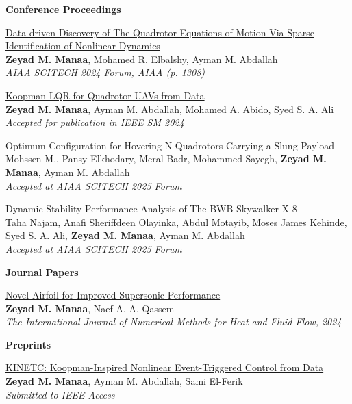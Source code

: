 \textbf{Conference Proceedings}
\begin{bibenum}
    \item \href{https://arxiv.org/pdf/2305.16500}{{Data-driven Discovery of The Quadrotor Equations of Motion Via Sparse Identification of Nonlinear Dynamics}}\\
    \textbf{Zeyad M. Manaa}, Mohamed R. Elbalshy, Ayman M. Abdallah\\
    \textit{AIAA SCITECH 2024 Forum, AIAA (p. 1308)}

    \item \href{https://arxiv.org/pdf/2406.17973}{Koopman-LQR for Quadrotor UAVs from Data}\\
    \textbf{Zeyad M. Manaa}, Ayman M. Abdallah, Mohamed A. Abido, Syed S. A. Ali\\
    \textit{Accepted for publication in IEEE SM 2024}

    \item {Optimum Configuration for Hovering N-Quadrotors Carrying a Slung Payload}\\
    Mohssen M., Pansy Elkhodary, Meral Badr, Mohammed Sayegh, \textbf{Zeyad M. Manaa}, Ayman M. Abdallah\\
    \textit{Accepted at AIAA SCITECH 2025 Forum}

    \item {Dynamic Stability Performance Analysis of The BWB Skywalker X-8}\\
    Taha Najam, Anafi Sheriffdeen Olayinka, Abdul Motayib, Moses James Kehinde, Syed S. A. Ali, \textbf{Zeyad M. Manaa}, Ayman M. Abdallah\\
    \textit{Accepted at AIAA SCITECH 2025 Forum}
\end{bibenum}
\vspace{0.5cm}

\textbf{Journal Papers}
\begin{bibenum}
    \item \href{https://www.emerald.com/insight/content/doi/10.1108/HFF-06-2024-0433/full/html}{Novel Airfoil for Improved Supersonic Performance}\\
    \textbf{Zeyad M. Manaa}, Naef A. A. Qassem\\
    \textit{The International Journal of Numerical Methods for Heat and Fluid Flow, 2024}
\end{bibenum}
\vspace{0.5cm}
\textbf{Preprints}
\begin{bibenum}
    \item \href{https://zmanaa.github.io/assets/publications/2024_KINETC/KINETC__Koopman_Inspired_Nonlinear_Event_Triggered_Control_from_Data.pdf}{KINETC: Koopman-Inspired Nonlinear Event-Triggered Control from Data}\\
    \textbf{Zeyad M. Manaa}, Ayman M. Abdallah, Sami El-Ferik\\
    \textit{Submitted to IEEE Access}
\end{bibenum}